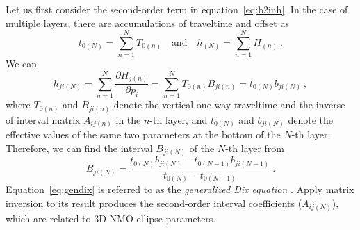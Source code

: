 Let us first consider the second-order term in equation~\ref{eq:b2inh}. In the case of multiple layers, there are  accumulations of traveltime and offset as
\begin{equation}
t_{0(N)} = \sum\limits^N_{n=1} T_{0(n)} \quad\mbox{and}\quad h_{(N)} = \sum\limits^N_{n=1} H_{(n)}~.
\end{equation}
We can 
\begin{equation}
h_{ji(N)} = \sum\limits^N_{n=1} \frac{\partial H_{j(n)}}{\partial p_i} = \sum\limits^N_{n=1} T_{0(n)} B_{ji(n)} = t_{0(N)}b_{ji(N)} ~,
\end{equation}
where $T_{0(n)}$ and $B_{ji(n)}$ denote the vertical one-way traveltime and the inverse of interval matrix $A_{ij(n)}$  in the $n$-th layer, and $t_{0(N)}$ and $b_{ji(N)}$ denote the effective values of the same two parameters at the bottom of the $N$-th layer. Therefore, we can find the interval $B_{ji(N)}$ of the $N$-th layer from
\begin{equation}
\label{eq:gendix}
B_{ji(N)} = \frac{t_{0(N)} b_{ji(N)}-t_{0(N-1)} b_{ji(N-1)}}{t_{0(N)}-t_{0(N-1)}}~. 
\end{equation}
Equation~\ref{eq:gendix} is referred to as the \textit{generalized Dix equation} \cite[]{tsvankin2011book}. Apply matrix inversion to its result produces the second-order interval coefficients ($A_{ij(N)}$), which are related to 3D NMO ellipse parameters. 

